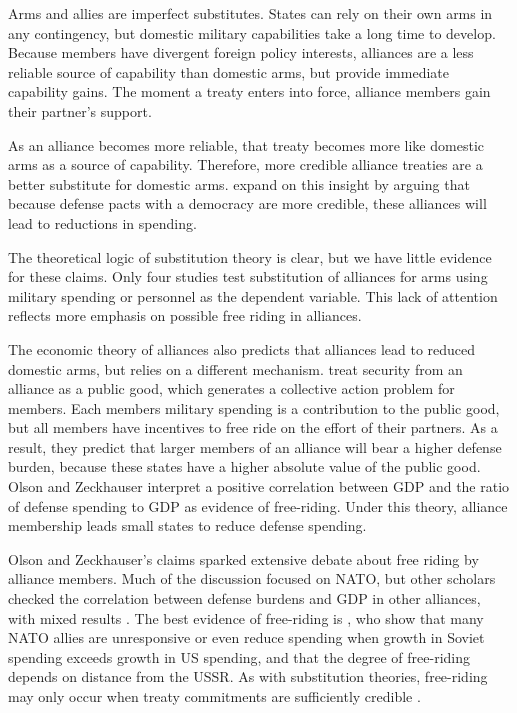 \documentclass[12pt]{article}
\begin{document}
Arms and allies are imperfect substitutes. States can rely on their own arms in any contingency, but domestic military capabilities take a long time to develop. Because members have divergent foreign policy interests, alliances are a less reliable source of capability than domestic arms, but provide immediate capability gains. The moment a treaty enters into force, alliance members gain their partner's support.

As an alliance becomes more reliable, that treaty becomes more like domestic arms as a source of capability. Therefore, more credible alliance treaties are a better substitute for domestic arms. \citet{DigiuseppePoast2016} expand on this insight by arguing that because defense pacts with a democracy are more credible, these alliances will lead to reductions in spending. 

The theoretical logic of substitution theory is clear, but we have little evidence for these claims. Only four studies test substitution of alliances for arms using military spending or personnel as the dependent variable. This lack of attention reflects more emphasis on possible free riding in alliances. 

The economic theory of alliances also predicts that alliances lead to reduced domestic arms, but relies on a different mechanism. \citet{OlsonZeckhauser1966} treat security from an alliance as a public good, which generates a collective action problem for members. Each members military spending is a contribution to the public good, but all members have incentives to free ride on the effort of their partners. As a result, they predict that larger members of an alliance will bear a higher defense burden, because these states have a higher absolute value of the public good. Olson and Zeckhauser interpret a positive correlation between GDP and the ratio of defense spending to GDP as evidence of free-riding. Under this theory, alliance membership leads small states to reduce defense spending. 

Olson and Zeckhauser's claims sparked extensive debate about free riding by alliance members. Much of the discussion focused on NATO, but other scholars checked the correlation between defense burdens and GDP in other alliances, with mixed results \citep{Reisinger1983, Thies1987, GatesTerasawa1992, OnealWhatley1996, Siroky2012}. The best evidence of free-riding is \citet{PluemperNeumayer2015}, who show that many NATO allies are unresponsive or even reduce spending when growth in Soviet spending exceeds growth in US spending, and that the degree of free-riding depends on distance from the USSR. As with substitution theories, free-riding may only occur when treaty commitments are sufficiently credible \citep{GatesTerasawa1992}. 
\end{document}
